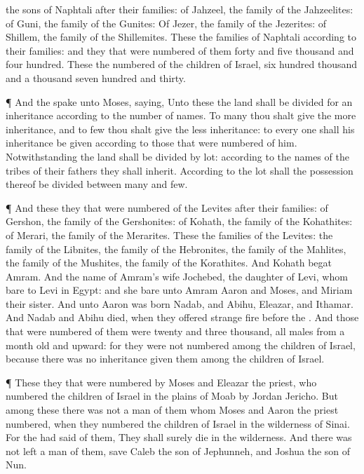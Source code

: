 {{} the
sons of
Naphtali after their
families: of
Jahzeel, the
family of the
Jahzeelites: of
Guni, the
family of the
Gunites:
Of
Jezer, the
family of the
Jezerites: of
Shillem, the
family of the
Shillemites.
These
{} the
families of
Naphtali according to their
families: and they that were
numbered of them
{}
forty and
five
thousand and
four
hundred.
These
{} the
numbered of the
children of
Israel,
six
hundred
thousand and a
thousand
seven
hundred and
thirty.
\par }{\PP {}¶ And the
{}
spake unto
Moses,
saying,
Unto these the
land shall be
divided for an
inheritance according to the
number of
names.
To
many thou shalt give the
more
inheritance, and to
few thou shalt give the
less
inheritance: to every
one shall his
inheritance be
given
according to those that were
numbered of him.
Notwithstanding the
land shall be
divided by
lot: according to the
names of the
tribes of their
fathers they shall
inherit.
According to the
lot shall the
possession thereof be
divided between
many and
few.
\par }{\PP {}¶ And these
{} they that were
numbered of the
Levites after their
families: of
Gershon, the
family of the
Gershonites: of
Kohath, the
family of the
Kohathites: of
Merari, the
family of the
Merarites.
These
{} the
families of the
Levites: the
family of the
Libnites, the
family of the
Hebronites, the
family of the
Mahlites, the
family of the
Mushites, the
family of the
Korathites. And
Kohath
begat
Amram.
And the
name of
Amram’s
wife
{}
Jochebed, the
daughter of
Levi, whom
{}
bare to
Levi in
Egypt: and she
bare unto
Amram
Aaron and
Moses, and
Miriam their
sister.
And unto
Aaron was
born
Nadab, and
Abihu,
Eleazar, and
Ithamar.
And
Nadab and
Abihu
died, when they
offered
strange
fire
before the
{}.
And those that were
numbered of them were
twenty and
three
thousand, all
males from a
month
old and
upward: for they were not
numbered
among the
children of
Israel, because there was no
inheritance
given them
among the
children of
Israel.
\par }{\PP {}¶ These
{} they that were
numbered by
Moses and
Eleazar the
priest, who
numbered the
children of
Israel in the
plains of
Moab by
Jordan
{}
Jericho.
But among these there was not a
man of them whom
Moses and
Aaron the
priest
numbered, when they
numbered the
children of
Israel in the
wilderness of
Sinai.
For the
{} had
said of them, They shall
surely
die in the
wilderness. And there was not
left a
man of them, save
Caleb the
son of
Jephunneh, and
Joshua the
son of
Nun.

}
